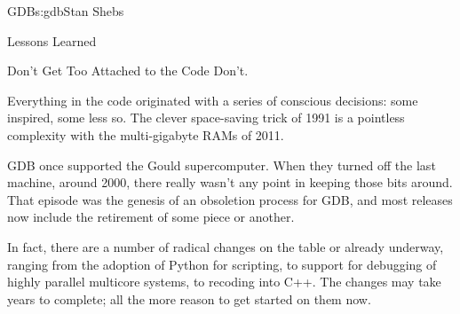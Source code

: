 \begin{aosachapter}{GDB}{s:gdb}{Stan Shebs}
\begin{aosasect1}{Lessons Learned}
\begin{aosasect2}{Don't Get Too Attached to the Code}
Don't.

Everything in the code originated with a series of conscious
decisions: some inspired, some less so.  The clever space-saving trick
of 1991 is a pointless complexity with the multi-gigabyte RAMs of
2011.

GDB once supported the Gould supercomputer. When they turned off the
last machine, around 2000, there really wasn't any point in keeping
those bits around.  That episode was the genesis of an obsoletion
process for GDB, and most releases now include the retirement of
some piece or another.

In fact, there are a number of radical changes on the table or already
underway, ranging from the adoption of Python for scripting, to
support for debugging of highly parallel multicore systems, to
recoding into C++.  The changes may take years to complete; all the
more reason to get started on them now.

\end{aosasect2}

\end{aosasect1}

\end{aosachapter}
